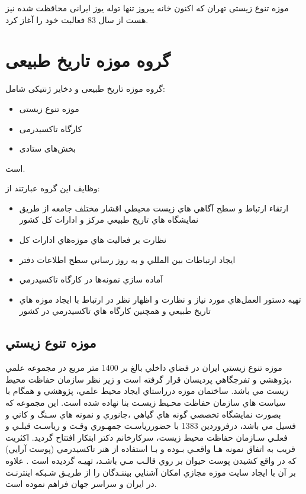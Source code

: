 موزه تنوع زیستی تهران که اکنون خانه پیروز تنها توله یوز ایرانی محاقظت شده نیز هست از سال 83 فعالیت خود را آغاز کرد. 


\section{گروه موزه تاریخ طبیعی}
گروه موزه تاریخ طبیعی و دخایر ژنتیکی شامل:
\begin{itemize}
    \item موزه تنوع زیستی
    \item کارگاه تاکسیدرمی
    \item بخش‌های ستادی
\end{itemize}
است.

وظایف این گروه عبارتند از:

\begin{itemize}
    \item ارتقاء ارتباط و سطح آگاهي هاي زيست محيطي اقشار مختلف جامعه از طريق نمايشگاه
    هاي تاريخ طبيعي مركز و ادارات كل كشور
    \item نظارت بر فعاليت هاي موزه‌هاي ادارات كل
    \item ايجاد ارتباطات بين المللي و به روز رساني سطح اطلاعات دفتر
    \item آماده سازي نمونه‌ها در كارگاه تاكسيدرمي
    \item تهيه دستور العمل‌هاي مورد نياز و نظارت و اظهار نظر در ارتباط با ايجاد موزه هاي تاريخ
    طبيعي و همچنين كارگاه هاي تاكسيدرمي در كشور
\end{itemize}

\subsection{موزه تنوع زيستي}
موزه تنوع زيستي ايران در فضاي داخلي بالغ بر 1400 متر مربع در مجموعه علمي ،پژوهشي و تفرجگاهي
پرديسان قرار گرفته است و زير نظر سازمان حفاظت محيط زيست مي باشد. 
ساختمان موزه درراستاي ايجاد محيط علمي، پژوهشي و همگام با سياست هاي سازمان حفاظت محـيط زيسـت
بنا نهاده شده است. اين مجموعه كه بصورت نمايشگاه تخصصي گونه هاي گياهي ،جانوري و نمونه هاي سـنگ و
كاني و فسيل مي باشد، درفروردين 1383 با حضوررياسـت جمهـوري وقـت و رياسـت قبلـي و فعلـي سـازمان
حفاظت محيط زيست، سركارخانم دكتر ابتكار افتتاح گرديد. اكثريت قريب به اتفاق نمونه هـا واقعـي بـوده و بـا
استفاده از هنر تاكسيدرمي (پوست آرايي) كه در واقع كشيدن پوست حيوان بر روي قالـب مـي باشـد، تهيـه
گرديده است . علاوه بر آن با ايجاد سايت موزه مجازي امكان آشنايي بيننـدگان را از طريـق شـبكه اينترنـت در
ايران و سراسر جهان فراهم نموده است.

